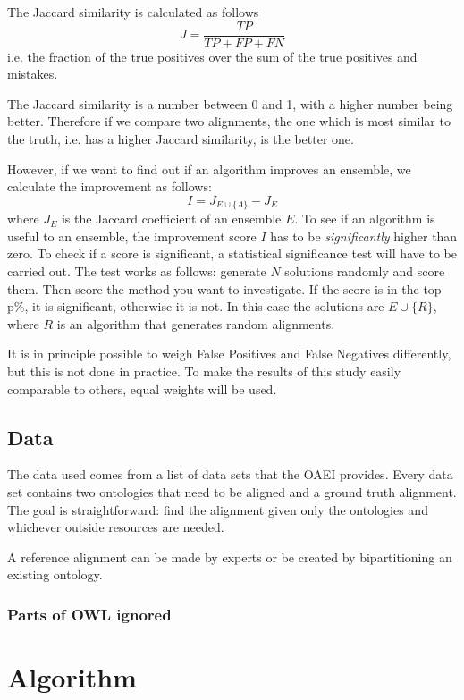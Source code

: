 \documentclass{article}
\begin{document}
 The Jaccard similarity is calculated as follows
 \[
 J = \frac{TP}{TP + FP + FN}
 \]
 i.e. the fraction of the true positives over the sum of the true positives and mistakes.
 
 The Jaccard similarity is a number between 0 and 1, with a higher number being better. Therefore if we compare two alignments, the one which is most similar to the truth, i.e. has a higher Jaccard similarity, is the better one.
 
 However, if we want to find out if an algorithm improves an ensemble, we calculate the improvement as follows:
 \[
 I = J_{E\cup \{A\}} - J_E
 \]
 where $J_E$ is the Jaccard coefficient of an ensemble $E$.
 To see if an algorithm is useful to an ensemble, the improvement score $I$ has to be \emph{significantly} higher than zero. To check if a score is significant, a statistical significance test will have to be carried out. The test works as follows: generate $N$ solutions randomly and score them. Then score the method you want to investigate. If the score is in the top p\%, it is significant, otherwise it is not. In this case the solutions are $E\cup \{R\}$, where $R$ is an algorithm that generates random alignments.
 
 It is in principle possible to weigh False Positives and False Negatives differently, but this is not done in practice. To make the results of this study easily comparable to others, equal weights will be used.
 \subsection{Data}
 The data used comes from a list of data sets that the OAEI provides. %
 Every data set contains two ontologies that need to be aligned and a ground truth alignment. The goal is straightforward: find the alignment given only the ontologies and whichever outside resources are needed.

 A reference alignment can be made by experts or be created by bipartitioning an existing ontology. %
 \subsubsection{Parts of OWL ignored} 
 
 \newpage
 \section{Algorithm}
\end{document}

